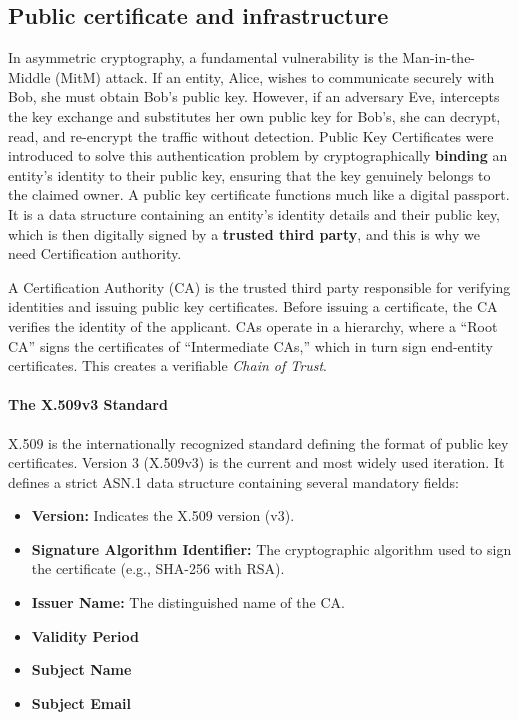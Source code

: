 \subsection{Public certificate and infrastructure}
In asymmetric cryptography, a fundamental vulnerability is the Man-in-the-Middle (MitM) attack. If an entity, Alice, wishes to communicate securely with Bob, she must obtain Bob's public key. However, if an adversary Eve, intercepts the key exchange and substitutes her own public key for Bob's, she can decrypt, read, and re-encrypt the traffic without detection. Public Key Certificates were introduced to solve this authentication problem by cryptographically \textbf{binding} an entity's identity to their public key, ensuring that the key genuinely belongs to the claimed owner.
A public key certificate functions much like a digital passport. It is a data structure containing an entity's identity details and their public key, which is then digitally signed by a \textbf{trusted third party}, and this is why we need Certification authority.

A Certification Authority (CA) is the trusted third party responsible for verifying identities and issuing public key certificates. Before issuing a certificate, the CA verifies the identity of the applicant. CAs operate in a hierarchy, where a ``Root CA'' signs the certificates of ``Intermediate CAs,'' which in turn sign end-entity certificates. This creates a verifiable \textit{Chain of Trust}.

\paragraph{The X.509v3 Standard}
X.509 is the internationally recognized standard defining the format of public key certificates. Version 3 (X.509v3) is the current and most widely used iteration. It defines a strict ASN.1 data structure containing several mandatory fields:
\begin{itemize}
    \item \textbf{Version:} Indicates the X.509 version (v3).
    \item \textbf{Signature Algorithm Identifier:} The cryptographic algorithm used to sign the certificate (e.g., SHA-256 with RSA).
    \item \textbf{Issuer Name:} The distinguished name of the CA.
    \item \textbf{Validity Period}
    \item \textbf{Subject Name}
    \item \textbf{Subject Email}
\end{itemize}


